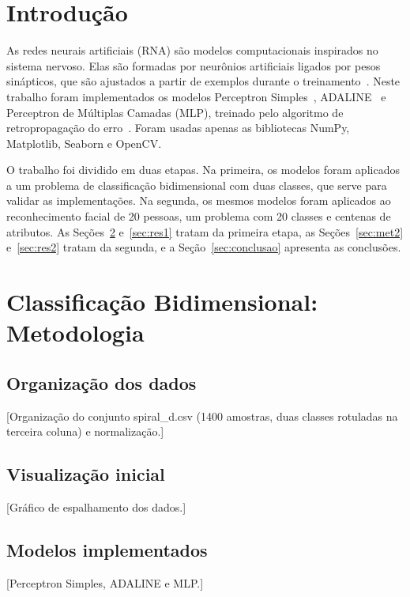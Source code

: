 \documentclass[conference]{IEEEtran}
\newcommand{\pendente}[1]{{\color{red}[#1]}}
\begin{document}
\section{Introdução}

As redes neurais artificiais (RNA) são modelos computacionais inspirados no
sistema nervoso. Elas são formadas por neurônios artificiais ligados por
pesos sinápticos, que são ajustados a partir de exemplos durante o
treinamento~\cite{b1}. Neste trabalho foram implementados os modelos
Perceptron Simples~\cite{b2}, ADALINE~\cite{b3} e Perceptron de Múltiplas
Camadas (MLP), treinado pelo algoritmo de retropropagação do
erro~\cite{b4}. Foram usadas apenas
as bibliotecas NumPy, Matplotlib, Seaborn e OpenCV.

O trabalho foi dividido em duas etapas. Na primeira, os modelos foram
aplicados a um problema de classificação bidimensional com duas classes,
que serve para validar as implementações. Na segunda, os mesmos modelos foram
aplicados ao reconhecimento facial de 20
pessoas, um problema com 20 classes e centenas de atributos. As
Seções~\ref{sec:met1} e~\ref{sec:res1} tratam da primeira etapa, as
Seções~\ref{sec:met2} e~\ref{sec:res2} tratam da segunda, e a
Seção~\ref{sec:conclusao} apresenta as conclusões.


\section{Classificação Bidimensional: Metodologia}\label{sec:met1}

\subsection{Organização dos dados}
\pendente{Organização do conjunto spiral\_d.csv (1400 amostras, duas
classes rotuladas na terceira coluna) e normalização.}

\subsection{Visualização inicial}
\pendente{Gráfico de espalhamento dos dados.}

\subsection{Modelos implementados}
\pendente{Perceptron Simples, ADALINE e MLP.}
\end{document}
